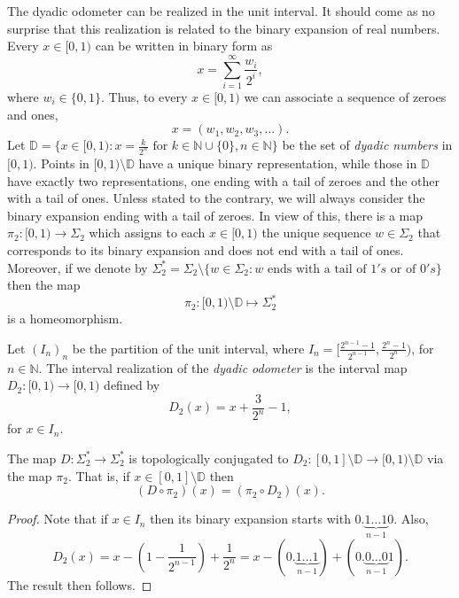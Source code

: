 \documentclass[letterpaper,10pt,reqno]{amsart}
\numberwithin{equation}{section}     %
\newcommand{\N}{\mathbb{N}}
\def\N{{\mathbb N}}
\begin{document}
The dyadic odometer can be realized in the unit interval. It should come as no surprise that this realization is related to the binary expansion of real numbers. Every $x \in [0,1)$ can be written in binary form as
\begin{equation*}
x= \sum_{i=1}^{\infty} \frac{w_i}{2^i},
\end{equation*}  
where $w_i \in \{0,1\}$.  Thus, to every $x \in [0,1)$  we can associate a sequence of  zeroes and ones,
\begin{equation*}
x=(w_1, w_2, w_3, \dots).
\end{equation*}
Let $\mathbb{D}= \{ x \in [0,1) : x= \frac{k}{2^n} \text{ for } k \in \N \cup\{0\} , n \in \N\}$ be the set of \emph{dyadic numbers} in $[0,1)$. Points in $[0,1) \setminus \mathbb{D}$ have a unique binary representation, while  those  in $\mathbb{D}$ have exactly two representations, one ending with a tail of zeroes and the other with a tail of ones. Unless stated {{}{to}} the contrary, we will always consider the binary expansion ending with a tail of  zeroes.  In view of this, there is a map
 $\pi_2:[0,1) \to \Sigma_{2}$ which assigns to each $x \in [0,1)$ the unique sequence $w \in \Sigma_{2}$  
 that corresponds to its binary expansion and does not end with a tail of ones. Moreover,  if we denote by
 $\Sigma_2^*= \Sigma_2 \setminus  \{w \in \Sigma_2 : w \text{ ends with a tail of } 1's \text{ or  of } 0's \} $ then the map
  \begin{equation*}
 \pi_2:[0,1) \setminus \mathbb{D} \mapsto \Sigma_2^*
  \end{equation*}
 is {{}{a}} homeomorphism.
 
\begin{definition}
Let  $(I_n)_n$ be the partition of the {{}{unit}} interval, where $I_n=[\frac{2^{n-1}-1}{2^{n-1}}, \frac{2^n-1}{2^{n}})$, for $n \in \N$. The 
interval realization of the \emph{dyadic odometer} is the interval map $D_2: [0,1) \to [0,1)$ defined by
\begin{equation*}
D_2(x) = x +\frac{3}{2^n}-1, 
\end{equation*}
for $x \in I_n$.
\end{definition}


\begin{proposition} \label{con_d}
The map $D: \Sigma_2^*\to \Sigma_2^*$ is topologically conjugated to $D_2: [0,1]\setminus \mathbb{D}  \to [0,1)   \setminus \mathbb{D}$ via the map $\pi_2$. That is, if $x \in [0,1]\setminus \mathbb{D}$ then
\begin{equation*}
(D \circ \pi_2)(x)=  ( \pi_2 \circ D_2)(x). 
\end{equation*}
\end{proposition}
\begin{proof}
Note that if $x \in I_n$ then its binary expansion  starts with $0.\underbrace{1\dots 1}_{n-1}0$. Also,
\[
D_2(x)=x-\left(1-\frac{1}{2^{n-1}}\right)+\frac{1}{2^n}=x-(0.\underbrace{1\dots 1}_{n-1})+(0.\underbrace{0\dots0}_{n-1}1).
\]
The result then follows.
\end{proof}
\end{document}

